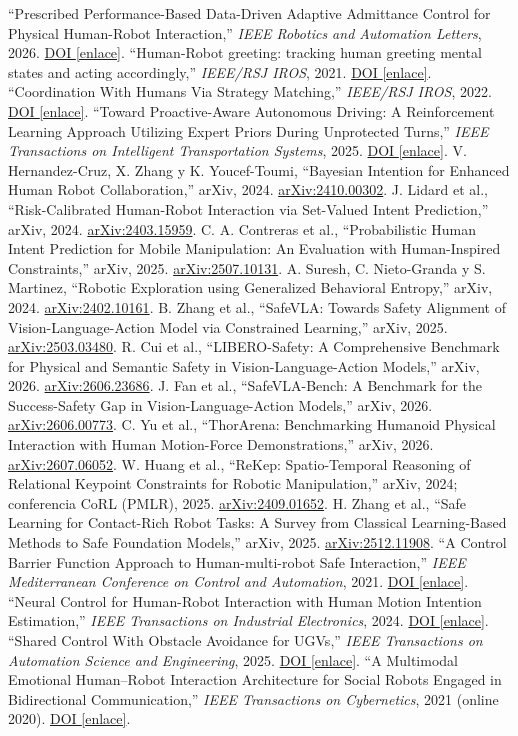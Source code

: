 \documentclass[10pt,a4paper,twocolumn]{article}
\newcommand{\arxiv}[1]{\href{https://arxiv.org/abs/#1}{arXiv:#1}}
\newcommand{\doi}[1]{\href{https://doi.org/#1}{DOI \textsf{[enlace]}}}
\begin{document}
\begin{thebibliography}{30}
 ``Prescribed Performance-Based Data-Driven Adaptive Admittance Control for Physical Human-Robot Interaction,'' \emph{IEEE Robotics and Automation Letters}, 2026. \doi{10.1109/LRA.2026.3701480}.
 ``Human-Robot greeting: tracking human greeting mental states and acting accordingly,'' \emph{IEEE/RSJ IROS}, 2021. \doi{10.1109/IROS51168.2021.9635894}.
 ``Coordination With Humans Via Strategy Matching,'' \emph{IEEE/RSJ IROS}, 2022. \doi{10.1109/IROS47612.2022.9982277}.
 ``Toward Proactive-Aware Autonomous Driving: A Reinforcement Learning Approach Utilizing Expert Priors During Unprotected Turns,'' \emph{IEEE Transactions on Intelligent Transportation Systems}, 2025. \doi{10.1109/TITS.2024.3520589}.
 V. Hernandez-Cruz, X. Zhang y K. Youcef-Toumi, ``Bayesian Intention for Enhanced Human Robot Collaboration,'' arXiv, 2024. \arxiv{2410.00302}.
 J. Lidard et al., ``Risk-Calibrated Human-Robot Interaction via Set-Valued Intent Prediction,'' arXiv, 2024. \arxiv{2403.15959}.
 C. A. Contreras et al., ``Probabilistic Human Intent Prediction for Mobile Manipulation: An Evaluation with Human-Inspired Constraints,'' arXiv, 2025. \arxiv{2507.10131}.
 A. Suresh, C. Nieto-Granda y S. Martinez, ``Robotic Exploration using Generalized Behavioral Entropy,'' arXiv, 2024. \arxiv{2402.10161}.
 B. Zhang et al., ``SafeVLA: Towards Safety Alignment of Vision-Language-Action Model via Constrained Learning,'' arXiv, 2025. \arxiv{2503.03480}.
 R. Cui et al., ``LIBERO-Safety: A Comprehensive Benchmark for Physical and Semantic Safety in Vision-Language-Action Models,'' arXiv, 2026. \arxiv{2606.23686}.
 J. Fan et al., ``SafeVLA-Bench: A Benchmark for the Success-Safety Gap in Vision-Language-Action Models,'' arXiv, 2026. \arxiv{2606.00773}.
 C. Yu et al., ``ThorArena: Benchmarking Humanoid Physical Interaction with Human Motion-Force Demonstrations,'' arXiv, 2026. \arxiv{2607.06052}.
 W. Huang et al., ``ReKep: Spatio-Temporal Reasoning of Relational Keypoint Constraints for Robotic Manipulation,'' arXiv, 2024; conferencia CoRL (PMLR), 2025. \arxiv{2409.01652}.
 H. Zhang et al., ``Safe Learning for Contact-Rich Robot Tasks: A Survey from Classical Learning-Based Methods to Safe Foundation Models,'' arXiv, 2025. \arxiv{2512.11908}.
 ``A Control Barrier Function Approach to Human-multi-robot Safe Interaction,'' \emph{IEEE Mediterranean Conference on Control and Automation}, 2021. \doi{10.1109/MED51440.2021.9480187}.
 ``Neural Control for Human-Robot Interaction with Human Motion Intention Estimation,'' \emph{IEEE Transactions on Industrial Electronics}, 2024. \doi{10.1109/TIE.2024.3379681}.
 ``Shared Control With Obstacle Avoidance for UGVs,'' \emph{IEEE Transactions on Automation Science and Engineering}, 2025. \doi{10.1109/TASE.2025.3582522}.
 ``A Multimodal Emotional Human--Robot Interaction Architecture for Social Robots Engaged in Bidirectional Communication,'' \emph{IEEE Transactions on Cybernetics}, 2021 (online 2020). \doi{10.1109/TCYB.2020.2974688}.
\end{thebibliography}
\end{document}
